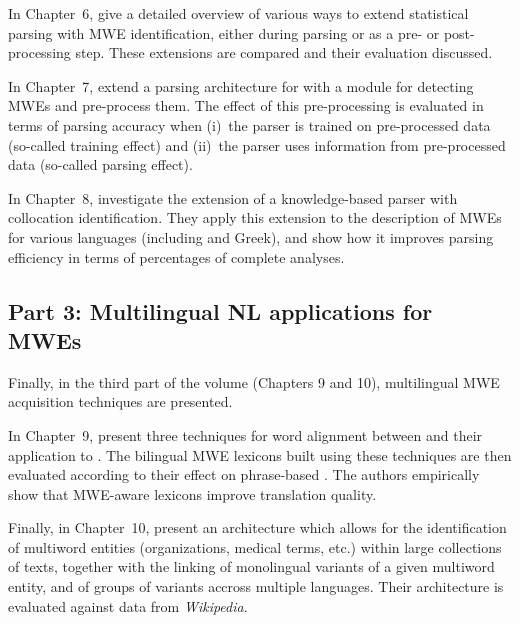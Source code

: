 \documentclass[output=paper]{langsci/langscibook}
\begin{document}
In Chapter~6, %
 give a detailed overview of various ways to extend statistical parsing
with MWE identification, either during parsing or as a pre- or
post-processing step. These extensions are compared and their
evaluation discussed.

In Chapter~7, %
 extend a 
parsing architecture for  with a module for detecting MWEs and
pre-process them. The effect of this pre-processing is evaluated in
terms of parsing accuracy when (i)~the parser is trained on
pre-processed data (so-called training effect) and (ii)~the parser
uses information from pre-processed data (so-called parsing effect).

In Chapter~8, %
 investigate the
extension of a knowledge-based parser with collocation
identification. They apply this extension to the description of MWEs
for various languages (including  and Greek), and show how it
improves parsing efficiency in terms of percentages of complete
analyses.

\subsection*{Part 3: Multilingual NL applications for MWEs}

Finally, in the third part of the volume (Chapters 9 and 10),
multilingual MWE acquisition techniques are presented.

In Chapter~9, %
 present three techniques for word alignment between 
and their application to . The bilingual MWE
lexicons built using these techniques are then evaluated according to
their effect on phrase-based . The
authors empirically show that MWE-aware lexicons improve translation
quality.

Finally, in Chapter~10, %
 present an architecture which allows for the
identification of multiword entities (organizations, medical terms,
etc.) within large collections of texts, together with the linking of
monolingual variants of a given multiword entity, and of groups of
variants accross multiple languages. Their architecture is evaluated
against data from \textit{Wikipedia}.
\end{document}

